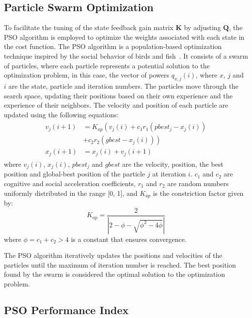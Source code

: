 \subsection{Particle Swarm Optimization}

To facilitate the tuning of the state feedback gain matrix $\mathbf{K}$ by adjusting $\mathbf{Q}$, the PSO algorithm is employed to optimize the weights associated with each state in the cost function. The PSO algorithm is a population-based optimization technique inspired by the social behavior of birds and fish~\cite{clercSwarmQueenDeterministic1999}. It consists of a swarm of particles, where each particle represents a potential solution to the optimization problem, in this case, the vector of powers $q_{x,j}(i)$, where $x$, $j$ and $i$ are the state, particle and iteration numbers. The particles move through the search space, updating their positions based on their own experience and the experience of their neighbors. The velocity and position of each particle are updated using the following equations:
\begin{align}
    \begin{aligned}
        v_j(i + 1) &= K_{ap}\left(v_j(i) + c_1 r_1 (pbest_j - x_j(i)) \right.\\
        & \left. + c_2 r_2 (gbest - x_j(i))\right)\\
        x_j(i + 1) &= x_j(i) + v_j(i + 1)
    \end{aligned}
\end{align}
where $v_j(i)$, $x_j(i)$, $pbest_j$ and $gbest$ are the velocity, position, the best position and global-best position of the particle $j$ at iteration $i$. $c_1$ and $c_2$ are cognitive and social acceleration coefficients, $r_1$ and $r_2$ are random numbers uniformly distributed in the range [0, 1], and $K_{ap}$ is the constriction factor given by:
\begin{equation}
    K_{ap} = \dfrac{2}{\left|2 - \phi - \sqrt{\phi^2 - 4\phi}\right|}
\end{equation}
where $\phi = c_1 + c_2 > 4$ is a constant that ensures convergence.

The PSO algorithm iteratively updates the positions and velocities of the particles until the maximum of iteration number is reached. The best position found by the swarm is considered the optimal solution to the optimization problem.

\subsection{PSO Performance Index}

